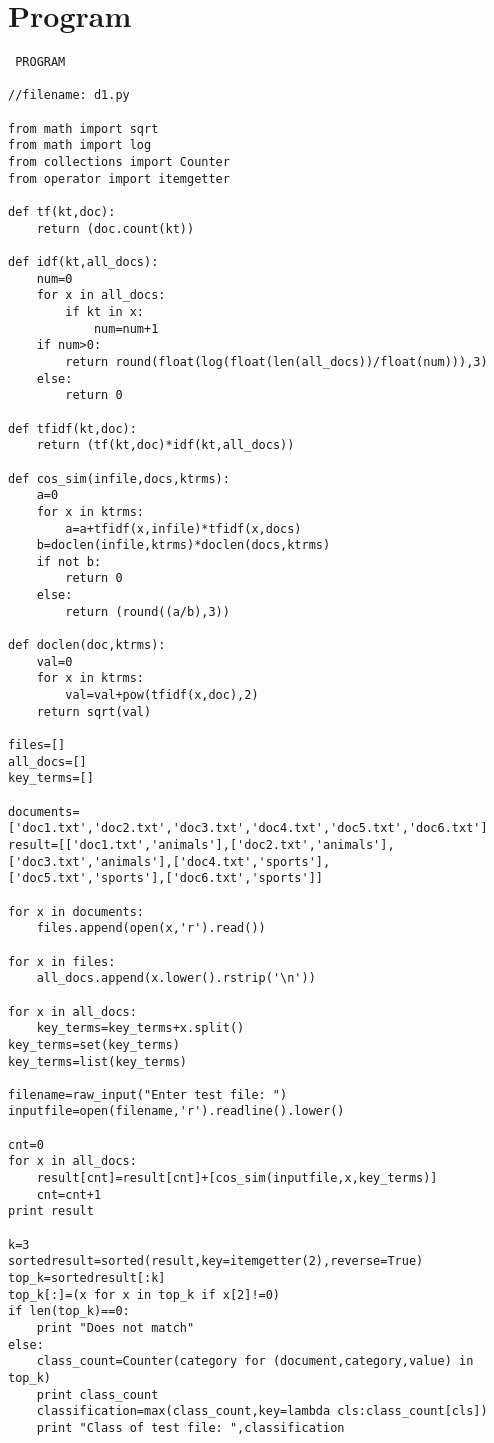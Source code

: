 \documentclass[10pt,a4paper]{article}
\begin{document}
\section{Program}
\begin{verbatim}
 PROGRAM

//filename: d1.py

from math import sqrt
from math import log
from collections import Counter
from operator import itemgetter

def tf(kt,doc):
	return (doc.count(kt))

def idf(kt,all_docs):
	num=0
	for x in all_docs:
		if kt in x:
			num=num+1
	if num>0:
		return round(float(log(float(len(all_docs))/float(num))),3)
	else:
		return 0

def tfidf(kt,doc):
	return (tf(kt,doc)*idf(kt,all_docs))

def cos_sim(infile,docs,ktrms):
	a=0
	for x in ktrms:
		a=a+tfidf(x,infile)*tfidf(x,docs)
	b=doclen(infile,ktrms)*doclen(docs,ktrms)
	if not b:
		return 0
	else:
		return (round((a/b),3))

def doclen(doc,ktrms):
	val=0
	for x in ktrms:
		val=val+pow(tfidf(x,doc),2)
	return sqrt(val)

files=[]
all_docs=[]
key_terms=[]

documents=['doc1.txt','doc2.txt','doc3.txt','doc4.txt','doc5.txt','doc6.txt']
result=[['doc1.txt','animals'],['doc2.txt','animals'],
['doc3.txt','animals'],['doc4.txt','sports'],
['doc5.txt','sports'],['doc6.txt','sports']]

for x in documents:
	files.append(open(x,'r').read())

for x in files:
	all_docs.append(x.lower().rstrip('\n'))

for x in all_docs:
	key_terms=key_terms+x.split()
key_terms=set(key_terms)
key_terms=list(key_terms)

filename=raw_input("Enter test file: ")
inputfile=open(filename,'r').readline().lower()

cnt=0
for x in all_docs:
	result[cnt]=result[cnt]+[cos_sim(inputfile,x,key_terms)]
	cnt=cnt+1
print result

k=3
sortedresult=sorted(result,key=itemgetter(2),reverse=True)
top_k=sortedresult[:k]
top_k[:]=(x for x in top_k if x[2]!=0)
if len(top_k)==0:
	print "Does not match"
else:
	class_count=Counter(category for (document,category,value) in top_k)
	print class_count
	classification=max(class_count,key=lambda cls:class_count[cls])
	print "Class of test file: ",classification



\end{verbatim}
\end{document}
